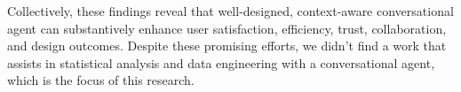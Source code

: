 Collectively, these findings reveal that well-designed, context-aware conversational agent can substantively enhance user satisfaction, efficiency, trust, collaboration, and design outcomes. Despite these promising efforts, we didn't find a work that assists in statistical analysis and data engineering with a conversational agent, which is the focus of this research.